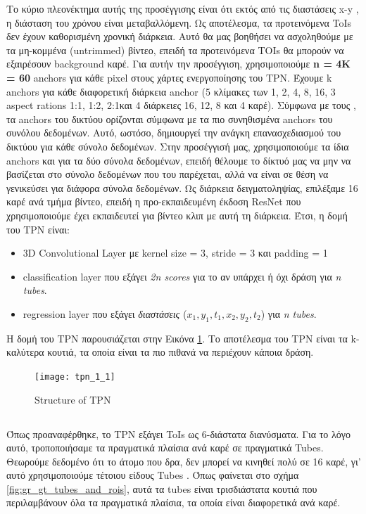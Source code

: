 Το κύριο πλεονέκτημα αυτής της προσέγγισης είναι ότι εκτός από τις διαστάσεις \en  x-y \gr , η διάσταση του χρόνου είναι μεταβαλλόμενη. Ως αποτέλεσμα, τα προτεινόμενα \en ToIs \gr
δεν έχουν καθορισμένη χρονική διάρκεια. Αυτό θα μας βοηθήσει να ασχοληθούμε με τα μη-κομμένα \en(untrimmed\gr) βίντεο, επειδή τα προτεινόμενα \en TOIs \gr  θα μπορούν να εξαιρέσουν \en background \gr
καρέ.
Για αυτήν την προσέγγιση, χρησιμοποιούμε \en\textbf{n = 4K = 60} anchors \gr  για κάθε \en  pixel \gr  στους χάρτες ενεργοποίησης του \en TPN\gr. Έχουμε \en k anchors \gr  για κάθε διαφορετική
  διάρκεια \en anchor \gr
 (5 κλίμακες των 1, 2, 4, 8, 16, 3 \en aspect rations 1:1, 1:2, 2:1\gr  και 4 διάρκειες 16, 12, 8 και 4 καρέ).
Σύμφωνα με τους \en\cite{DBLP:journals/corr/HouCS17}\gr,  τα \en anchors \gr  του δικτύου ορίζονται σύμφωνα με τα πιο συνηθισμένα \en anchors \gr  του συνόλου δεδομένων. Αυτό, ωστόσο,
δημιουργεί την ανάγκη επανασχεδιασμού του δικτύου για κάθε σύνολο δεδομένων. Στην προσέγγισή μας, χρησιμοποιούμε τα ίδια \en  anchors \gr  και για τα δύο σύνολα δεδομένων, επειδή θέλουμε το δίκτυό
μας να μην να βασίζεται στο σύνολο δεδομένων που του παρέχεται, αλλά να είναι σε θέση να γενικεύσει για διάφορα σύνολα δεδομένων. Ως διάρκεια δειγματοληψίας, επιλέξαμε 16 καρέ ανά τμήμα βίντεο, επειδή
η προ-εκπαιδευμένη έκδοση \en  ResNet \gr  που χρησιμοποιούμε έχει εκπαιδευτεί για βίντεο κλιπ με αυτή τη διάρκεια.
Έτσι, η δομή του \en  TPN \gr  είναι:
\begin{itemize}
\item{} 3D Convolutional Layer \gr με \en kernel size = 3, stride = 3 \gr  και \en padding = 1
\item{} classification layer \gr  που εξάγει \en \textit{2n scores} \gr  για το αν υπάρχει ή όχι δράση για \en\textit{n tubes}.
\item{} regression layer \gr  που εξάγει \textit{ διαστάσεις} \en ($x_1,y_1,t_1,x_2,y_2,t_2$) \gr  για \en\textit{n tubes}.
\end{itemize}

Η δομή του \en TPN \gr  παρουσιάζεται στην Εικόνα \ref{fig:gr_tpn_1_1}. Το αποτέλεσμα του \en  TPN \gr είναι τα \en   k\gr-καλύτερα κουτιά, τα οποία
είναι τα πιο πιθανά να περιέχουν κάποια δράση.

\en
\begin{figure}[h]
  \texttt{[image: tpn\_1\_1]}
  \caption{\en Structure of TPN}
  \label{fig:gr_tpn_1_1}
\end{figure}
\gr

\subsection{}
\gr Όπως προαναφέρθηκε, το \en TPN \gr  εξάγει \en  ToIs \gr  ως 6-διάστατα διανύσματα. Για το λόγο αυτό, τροποποιήσαμε τα πραγματικά πλαίσια ανά καρέ σε πραγματικά \en  Tubes\gr.
Θεωρούμε δεδομένο ότι το άτομο που δρα, δεν μπορεί να κινηθεί πολύ σε 16 καρέ, γι' αυτό χρησιμοποιούμε τέτοιου είδους \en  Tubes \gr. Όπως φαίνεται 
στο σχήμα \ref{fig:gr_gt_tubes_and_rois}, αυτά τα \en tubes \gr είναι τρισδιάστατα κουτιά που περιλαμβάνουν όλα τα πραγματικά πλαίσια, τα οποία είναι διαφορετικά
ανά καρέ.


